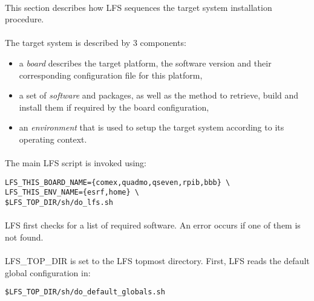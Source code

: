 \documentclass[a4paper, 11pt]{article}
\begin{document}
\paragraph{}
This section describes how LFS sequences the target system installation procedure.

\paragraph{}
The target system is described by 3 components:
\begin{itemize}
\item a \textit{board} describes the target platform, the software version and
their corresponding configuration file for this platform,
\item a set of \textit{software} and packages, as well as the method to retrieve,
build and install them if required by the board configuration,
\item an \textit{environment} that is used to setup the target system according
to its operating context.
\end{itemize}

\paragraph{}
The main LFS script is invoked using:\\

\begin{lstlisting}[frame=tb]
LFS_THIS_BOARD_NAME={comex,quadmo,qseven,rpib,bbb} \
LFS_THIS_ENV_NAME={esrf,home} \
$LFS_TOP_DIR/sh/do_lfs.sh
\end{lstlisting}

\paragraph{}
LFS first checks for a list of required software. An error occurs if one of them
is not found.

\paragraph{}
LFS\_TOP\_DIR is set to the LFS topmost directory. First, LFS reads the default
global configuration in:\\

\begin{lstlisting}[frame=tb]
$LFS_TOP_DIR/sh/do_default_globals.sh
\end{lstlisting}
\end{document}
